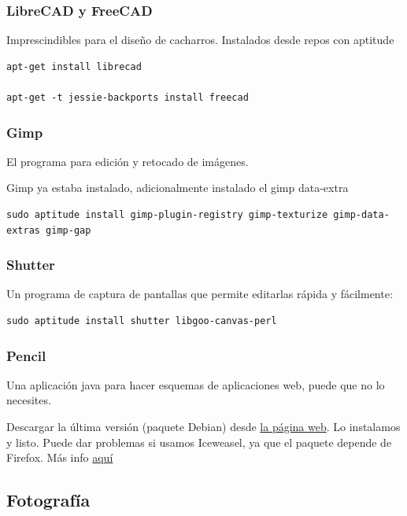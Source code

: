 \documentclass[12pt,spanish,]{scrartcl}
\begin{document}
\subsubsection{LibreCAD y FreeCAD}\label{librecad-y-freecad}

Imprescindibles para el diseño de cacharros. Instalados desde repos con
aptitude

\begin{verbatim}
apt-get install librecad

apt-get -t jessie-backports install freecad
\end{verbatim}

\subsubsection{Gimp}\label{gimp}

El programa para edición y retocado de imágenes.

Gimp ya estaba instalado, adicionalmente instalado el gimp data-extra

\begin{verbatim}
sudo aptitude install gimp-plugin-registry gimp-texturize gimp-data-extras gimp-gap
\end{verbatim}

\subsubsection{Shutter}\label{shutter}

Un programa de captura de pantallas que permite editarlas rápida y
fácilmente:

\begin{verbatim}
sudo aptitude install shutter libgoo-canvas-perl
\end{verbatim}

\subsubsection{Pencil}\label{pencil}

Una aplicación java para hacer esquemas de aplicaciones web, puede que
no lo necesites.

Descargar la última versión (paquete Debian) desde
\href{http://pencil.evolus.vn/}{la página web}. Lo instalamos y listo.
Puede dar problemas si usamos Iceweasel, ya que el paquete depende de
Firefox. Más info
\href{https://www.linuxwebzone.com/install-pencil-on-debian/}{aquí}

\subsection{Fotografía}\label{fotografuxeda}
\end{document}
